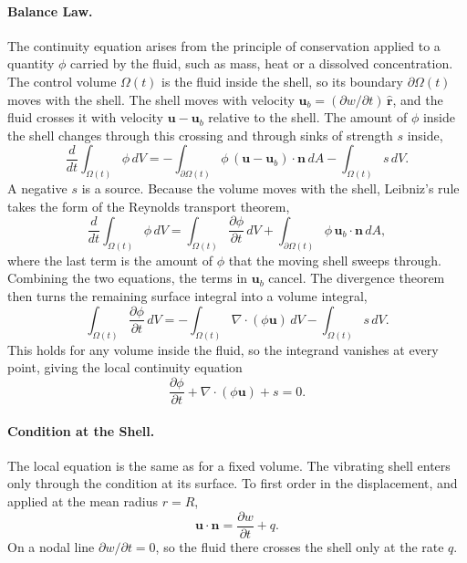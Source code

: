 \documentclass[12pt]{article}
\begin{document}
\paragraph{Balance Law.} The continuity equation arises from the principle of conservation applied to a quantity $\phi$ carried by the fluid, such as mass, heat or a dissolved concentration. The control volume $\Omega(t)$ is the fluid inside the shell, so its boundary $\partial\Omega(t)$ moves with the shell. The shell moves with velocity $\bm{u}_b = (\partial w/\partial t)\,\hat{\bm r}$, and the fluid crosses it with velocity $\bm{u} - \bm{u}_b$ relative to the shell. The amount of $\phi$ inside the shell changes through this crossing and through sinks of strength $s$ inside,
%
\begin{equation}
\frac{d}{dt}\int_{\Omega(t)} \phi \, dV = -\int_{\partial\Omega(t)} \phi\, (\bm{u} - \bm{u}_b)\cdot \bm{n} \, dA - \int_{\Omega(t)} s \, dV.
\label{eq:balance}
\end{equation}
%
A negative $s$ is a source. Because the volume moves with the shell, Leibniz's rule takes the form of the Reynolds transport theorem,
%
\begin{equation}
\frac{d}{dt}\int_{\Omega(t)} \phi \, dV = \int_{\Omega(t)} \frac{\partial \phi}{\partial t} \, dV + \int_{\partial\Omega(t)} \phi\, \bm{u}_b\cdot \bm{n} \, dA,
\end{equation}
%
where the last term is the amount of $\phi$ that the moving shell sweeps through. Combining the two equations, the terms in $\bm{u}_b$ cancel. The divergence theorem then turns the remaining surface integral into a volume integral,
%
\begin{equation}
\int_{\Omega(t)} \frac{\partial \phi}{\partial t} \, dV = -\int_{\Omega(t)} \nabla\cdot(\phi \bm{u}) \, dV - \int_{\Omega(t)} s \, dV.
\end{equation}
%
This holds for any volume inside the fluid, so the integrand vanishes at every point, giving the local continuity equation
%
\begin{equation}
\frac{\partial \phi}{\partial t} + \nabla\cdot(\phi \bm{u}) + s = 0.
\label{eq:continuity}
\end{equation}

\paragraph{Condition at the Shell.} The local equation is the same as for a fixed volume. The vibrating shell enters only through the condition at its surface. To first order in the displacement, and applied at the mean radius $r = R$,
%
\begin{equation}
\bm{u}\cdot\bm{n} = \frac{\partial w}{\partial t} + q.
\label{eq:normal_bc}
\end{equation}
%
On a nodal line $\partial w/\partial t = 0$, so the fluid there crosses the shell only at the rate $q$.
\end{document}
